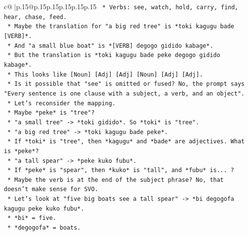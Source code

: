 \documentclass{article}
\begin{document}
{\begin{supertabular}{c@{$\;$}|p{.15\linewidth}@{}p{.15\linewidth}p{.15\linewidth}p{.15\linewidth}p{.15\linewidth}p{.15\linewidth}}
{{{\texttt{                                        *   Verbs: see, watch, hold, carry, find, hear, chase, feed.} \\
\texttt{                                        *   Maybe the translation for "a big red tree" is *toki kagugu bade {[}VERB{]}*.} \\
\texttt{                                        *   And "a small blue boat" is *{[}VERB{]} degogo gidido kabage*.} \\
\texttt{                                        *   But the translation is *toki kagugu bade peke degogo gidido kabage*.} \\
\texttt{                                        *   This looks like {[}Noun{]} {[}Adj{]} {[}Adj{]} {[}Noun{]} {[}Adj{]} {[}Adj{]}.} \\
\texttt{                                        *   Is it possible that "see" is omitted or fused? No, the prompt says "Every sentence is one clause with a subject, a verb, and an object".} \\
\texttt{                                        *   Let's reconsider the mapping.} \\
\texttt{                                        *   Maybe *peke* is "tree"?} \\
\texttt{                                            *   "a small tree" {-}> *toki gidido*. So *toki* is "tree".} \\
\texttt{                                            *   "a big red tree" {-}> *toki kagugu bade peke*.} \\
\texttt{                                            *   If *toki* is "tree", then *kagugu* and *bade* are adjectives. What is *peke*?} \\
\texttt{                                            *   "a tall spear" {-}> *peke kuko fubu*.} \\
\texttt{                                            *   If *peke* is "spear", then *kuko* is "tall", and *fubu* is... ?} \\
\texttt{                                            *   Maybe the verb is at the end of the subject phrase? No, that doesn't make sense for SVO.} \\
\texttt{                                            *   Let's look at "five big boats see a tall spear" {-}> *bi degogofa kagugu peke kuko fubu*.} \\
\texttt{                                                *   *bi* = five.} \\
\texttt{                                                *   *degogofa* = boats.} \\
}}}
\end{supertabular}}
\end{document}
